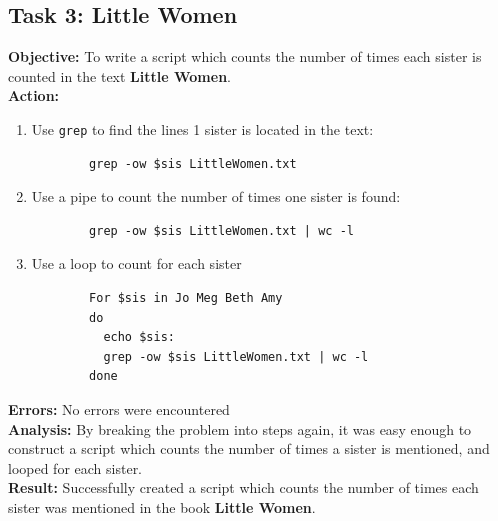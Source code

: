 \documentclass{article}
\begin{document}
\subsection{Task 3: Little Women}
%
\textbf{Objective:} To write a script which counts the number of times each sister is counted in the text \textbf{Little Women}.\\
\textbf{Action:}
\begin{enumerate}
    \item Use \texttt{grep} to find the lines 1 sister is located in the text:
    \begin{verbatim}
        grep -ow $sis LittleWomen.txt
    \end{verbatim}
    \item Use a pipe to count the number of times one sister is found:
    \begin{verbatim}
        grep -ow $sis LittleWomen.txt | wc -l
    \end{verbatim}
    \item Use a loop to count for each sister
    \begin{verbatim}
        For $sis in Jo Meg Beth Amy
        do
          echo $sis:
          grep -ow $sis LittleWomen.txt | wc -l
        done
    \end{verbatim}
\end{enumerate}
\textbf{Errors:} No errors were encountered\\
\textbf{Analysis:} By breaking the problem into steps again, it was easy enough to construct a script which counts the number of times a sister is mentioned, and looped for each sister.\\
\textbf{Result:} Successfully created a script which counts the number of times each sister was mentioned in the book \textbf{Little Women}.
%
\end{document}
